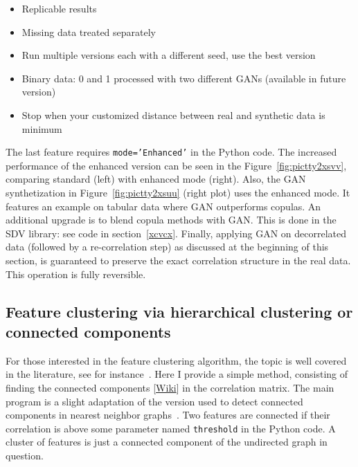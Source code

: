 \documentclass[oneside,10pt]{book}
\begin{document}
\begin{itemize}
\item Replicable results
\item Missing data treated separately
\item Run multiple versions each with a different seed, use the best version
\item Binary data: 0 and 1 processed with two different GANs (available in future version)
\item Stop when your customized distance between real and synthetic data is minimum
\end{itemize}\vspace{1ex}

\noindent The last feature requires  \texttt{mode='Enhanced'} in the Python code. The increased performance of the enhanced version can be seen in the Figure~\ref{fig:pictty2xsvv}, comparing standard (left) with enhanced mode (right). Also, the GAN synthetization
 in Figure~\ref{fig:pictty2xsuu} (right plot) uses the enhanced mode. It features an example on tabular data where GAN outperforms copulas.  An additional upgrade is to blend copula methods with GAN. This is done in the SDV library: see code in
 section~\ref{xcvcx}. Finally, applying GAN on decorrelated data (followed by a re-correlation step) as discussed at the
 beginning of this section, is guaranteed to
 preserve the exact correlation structure in the real data. This operation is fully reversible.

\subsection{Feature clustering via hierarchical clustering or connected components}\label{dk6fb}

For those interested in the \textcolor{index}{feature clustering} algorithm,
 the topic is well covered in the literature, see for instance~\cite{fcnice}.  Here I provide a simple method, consisting of finding the \textcolor{index}{connected components}
 [\href{https://en.wikipedia.org/wiki/Component_(graph_theory)}{Wiki}] in the correlation matrix. The main program is a slight adaptation of the version used to detect
 connected components in nearest neighbor graphs~\cite{vgelsevier}.
 Two features are connected if their correlation is above some parameter named \texttt{threshold} in the Python code.  A cluster of features is just a connected component of the
 \textcolor{index}{undirected graph} in question.
\end{document}
